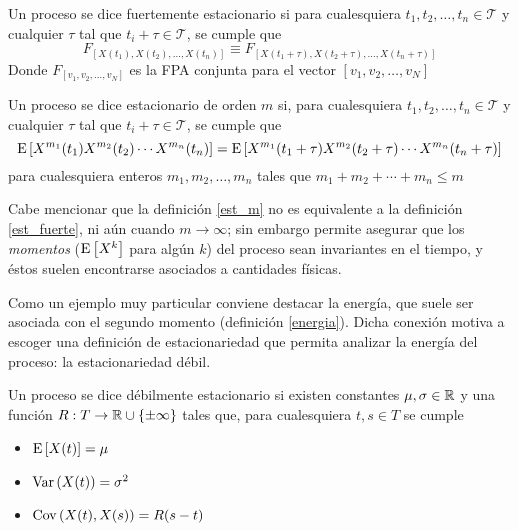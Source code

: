 \begin{definicion}
Un proceso \xt se dice fuertemente estacionario si para cualesquiera 
$t_1, t_2, \dots, t_n \in \mathcal{T}$ y cualquier $\tau$ tal que $t_i + \tau \in \mathcal{T}$,
se cumple que
\begin{equation*}
F_{\left[ X(t_1), X(t_2), \dots, X(t_n) \right]} \equiv
F_{\left[ X(t_1 + \tau), X(t_2 + \tau), \dots, X(t_n + \tau) \right]}
\end{equation*}
Donde $F_{[v_1,v_2,\dots,v_N]}$ es la FPA conjunta para el vector $[v_1,v_2,\dots,v_N]$
\label{est_fuerte}
\end{definicion}

\begin{definicion}
Un proceso \xt se dice estacionario de orden $m$ si, para cualesquiera
$t_1, t_2, \dots, t_n \in \mathcal{T}$ y cualquier $\tau$ tal que $t_i + \tau \in \mathcal{T}$,
se cumple que
\begin{equation*}
\mathrm{E}\left[ X^{m_1}(t_1)X^{m_2}(t_2)\cdots X^{m_n}(t_n) \right] =
\mathrm{E}\left[ X^{m_1}(t_1+\tau)X^{m_2}(t_2+\tau)\cdots X^{m_n}(t_n+\tau) \right]
\end{equation*}
para cualesquiera enteros $m_1, m_2, \dots, m_n$ tales que $m_1+m_2+\cdots+m_n \leq m$
\label{est_m}
\end{definicion}

Cabe mencionar que la definición \ref{est_m} no es equivalente a la definición \ref{est_fuerte}, ni
aún cuando $m\rightarrow \infty$; sin embargo permite asegurar que los \textit{momentos} 
($\mathrm{E}\left[ X^{k} \right]$ para algún $k$) del proceso sean invariantes en el tiempo, y éstos suelen encontrarse
asociados a cantidades físicas.

Como un ejemplo muy particular conviene destacar la energía, que suele ser asociada con el segundo
momento (definición \ref{energia}). 
%
Dicha conexión motiva a escoger una definición de estacionariedad que permita analizar la energía 
del proceso: la estacionariedad débil.

\begin{definicion}
Un proceso \xt se dice débilmente estacionario si existen constantes $\mu, \sigma \in \mathbb{R}$ y una 
función $R : T \rightarrow \mathbb{R} \cup \{ \pm \infty \} $ tales que, para cualesquiera $t, s \in T$ se 
cumple
\begin{itemize}
\item $\mathrm{E}\left[ X(t) \right] = \mu$
\item $\mathrm{Var}\left( X(t) \right) = \sigma^{2}$
\item $\mathrm{Cov}\left( X(t),X(s) \right) = R(s-t)$
\end{itemize}
\end{definicion}

